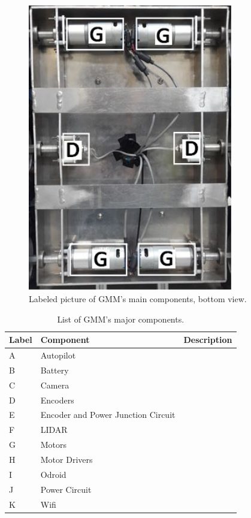 \documentclass[letterpaper,12pt]{report}
\begin{document}
\begin{figure}[h]
	\centering
	\includegraphics[width=0.8\textwidth]{GMM2.jpg}
	\caption{Labeled picture of GMM's main components, bottom view.}
	\label{Figure 1:}
\end{figure}
\begin{table}
\begin{tabular}{| l | p{3cm} | p{10cm} |}
 		\hline
 		Label & Component & Description \\ \hline 
 		A & Autopilot & \\ \hline
 		B & Battery & \\ \hline
 		C & Camera & \\ \hline
 		D & Encoders & \\ \hline
 		E & Encoder and Power Junction Circuit & \\ \hline
 		F & LIDAR & \\ \hline
 		G & Motors & \\ \hline
 		H & Motor Drivers & \\ \hline
 		I & Odroid & \\ \hline
 		J & Power Circuit & \\ \hline
 		K & Wifi & \\ \hline
 
	\end{tabular}
	\caption{List of GMM's major components.}
\end{table}
\end{document}
